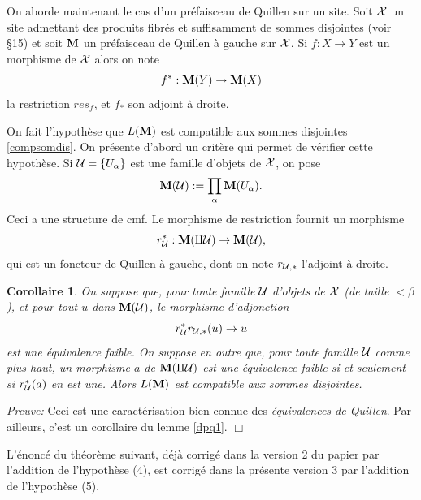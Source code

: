 \documentclass[12pt]{article}
\newcommand{\eop}{\hfill $\Box$\vspace{.1in}}
\newtheorem{corollaire}[lemma]{Corollaire}
\newcommand{\mm}{{\bf M}}
\newcommand{\Uu}{{\cal U}}
\newcommand{\Xx}{{\cal X}}
\begin{document}
\bigskip

On aborde maintenant le cas d'un pr\'efaisceau de Quillen
sur un site. Soit $\Xx$ un site admettant des produits fibr\'es et suffisamment
de sommes disjointes (voir \S 15) et soit $\mm$ un pr\'efaisceau de Quillen \`a
gauche sur $\Xx$.
Si $f:X\rightarrow Y$ est un
morphisme de $\Xx$ alors on note
$$
f^{\ast}: \mm (Y)\rightarrow \mm (X)
$$
la restriction $res_f$, et $f_{\ast}$ son adjoint \`a droite.

On fait l'hypoth\`ese que $L(\mm )$ est compatible aux sommes disjointes
\ref{compsomdis}. On pr\'esente d'abord un crit\`ere qui permet de v\'erifier
cette hypoth\`ese.
Si $\Uu = \{ U_{\alpha}\}$ est une famille d'objets de $\Xx$, on pose
$$
\mm (\Uu ):= \prod _{\alpha} \mm (U_{\alpha}).
$$
Ceci a une structure de cmf.
Le morphisme de restriction fournit un morphisme
$$
r_{\Uu}^{\ast}:\mm (\amalg \Uu )\rightarrow \mm (\Uu ),
$$
qui est un
foncteur de Quillen \`a gauche,
dont on note $r_{\Uu , \ast}$ l'adjoint \`a droite.

\begin{corollaire}
\label{compsomcritere}
On suppose que, pour toute famille $\Uu$ d'objets de $\Xx$ (de taille $<\beta$),
et pour tout $u$ dans $\mm (\Uu )$, le morphisme d'adjonction
$$
r_{\Uu}^{\ast} r_{\Uu , \ast} (u)\rightarrow u
$$
est une \'equivalence faible. On suppose en outre que, pour toute famille $\Uu$
comme plus haut, un
morphisme $a$ de $\mm (\amalg \Uu )$ est une \'equivalence faible
si et seulement si $r_{\Uu}^{\ast} (a)$ en est une. Alors
$L(\mm )$ est compatible aux sommes disjointes.
\end{corollaire}
{\em Preuve:} Ceci est une caract\'erisation bien connue des {\em \'equivalences
de Quillen}. Par ailleurs, c'est un corollaire du lemme \ref{dpq1}.
\eop

L'\'enonc\'e du th\'eor\`eme suivant, d\'ej\`a corrig\'e dans la 
version 2 du papier par l'addition de  l'hypoth\`ese (4), est corrig\'e dans la
pr\'esente version 3 par l'addition de 
l'hypoth\`ese (5).
\end{document}
